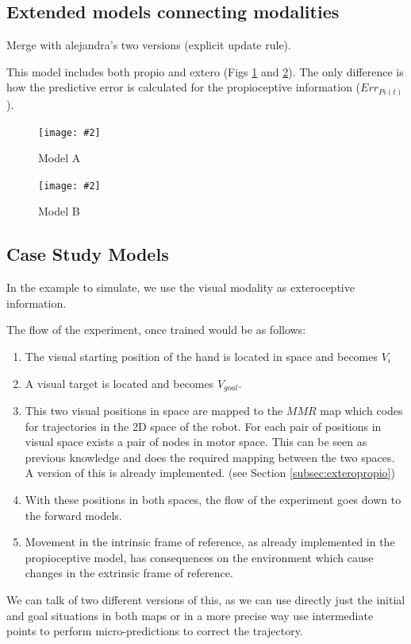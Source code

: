 \documentclass[11pt]{llncs}
\newcommand{\figone}[4]{
  \begin{figure}[ht]
  \begin{center}
  \texttt{[image: \#2]}
  \begin{sl}
  \caption{\label{#1}#3}
  \end{sl}
  \end{center}
  \end{figure}
}
\newcommand{\figtikz}[4]{
\begin{figure}[ht]
\begin{center}
\scalebox{#4}{}
\begin{sl}
\caption{\label{#1}#3}
\end{sl}
\end{center}
\end{figure}
}
\begin{document}
\subsection{Extended models connecting modalities}

Merge with alejandra's two versions (explicit update rule).

This model includes both propio and extero (Figs \ref{fig:basic1}
and \ref{fig:basic2}). The only difference is how the 
predictive error is calculated for the propioceptive information ($Err_{Pi(t)}$).


\figone{fig:basic1}{Integral_v3}{Model A}{0.8}
\figone{fig:basic2}{Integral_v4}{Model B}{0.8}

\subsection{Case Study Models}

In the example to simulate, we use the visual modality as exteroceptive
information. 

The flow of the experiment, once trained would be as follows:

\begin{enumerate}
\item The visual starting position of the hand is located in space and becomes $V_i$
\item A visual target is located and becomes $V_{goal}$.
\item This two visual positions in space are mapped to the  $MMR$ map which
  codes for trajectories in the 2D space of the robot. For each pair of
  positions in visual space exists a pair of nodes in motor space. This can be
  seen as previous knowledge  and does the required mapping between the two
  spaces. A version of this is already implemented. (see Section \ref{subsec:exteropropio})
\item With these positions in both spaces, the flow of the experiment goes
  down to the forward models. 
\item Movement in the intrinsic frame of reference, as already implemented in the propioceptive model, has
  consequences on the environment which cause changes in the extrinsic frame
  of reference.  

\end{enumerate}

We can talk of two different versions of this, as we can use directly just the
initial and goal situations in both maps or in a more precise way use
intermediate points to perform micro-predictions to correct the trajectory.
\end{document}

